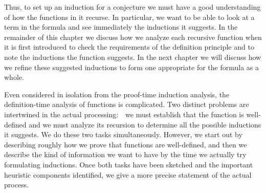 \documentclass[11pt]{book}
\begin{document}
Thus, to set up an induction for a conjecture we must have a good
understanding of how the functions in it recurse.  In particular, we
want to be able to look at a term in the formula and  see
immediately the inductions it suggests.  In the remainder of this
chapter we discuss how we analyze each recursive function
when it is first introduced  to check the
requirements of the definition principle and to  note the inductions
the function suggests.  In the next chapter we will discuss how we
refine these suggested inductions to form one
appropriate for the formula as a whole.

Even considered in isolation from the proof-time induction analysis,
the definition-time analysis of functions is  complicated.
 Two distinct problems are intertwined in the
actual processing:~~we must establish that the function is well-defined and
we must analyze its recursion to determine all the possible inductions it
suggests.  We do these two tasks simultaneously.
However, we  start out by describing roughly how we
prove that functions are well-defined, and then we  describe the kind of information
we want to have  by the time we actually try formulating
inductions.  Once both tasks have been sketched and the important
heuristic components identified, we  give a more precise statement of
the actual process.
\end{document}
